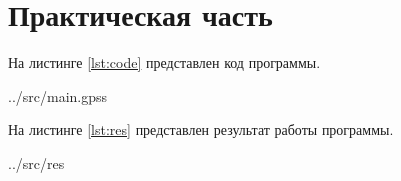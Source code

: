 \chapter{Практическая часть}

На листинге \ref{lst:code} представлен код программы.

\begin{lstinputlisting}[label=lst:code,caption=Событийный принцип, language=c]{../src/main.gpss}
\end{lstinputlisting}

На листинге \ref{lst:res} представлен результат работы программы.

\begin{lstinputlisting}[label=lst:code,caption=Событийный принцип, language=c]{../src/res}
\end{lstinputlisting}